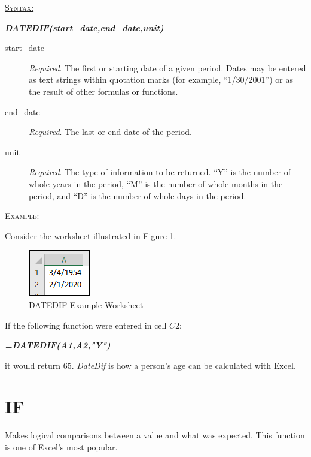\begin{addmargin}[1cm]{0cm}

	\medskip
	\underline{\textsc{Syntax:}}
	\medskip

	{\color{Syntax}
		\noindent\textbf{\textit{DATEDIF(start\_date,end\_date,unit)}}
	}
	
	\begin{description}
		\item[start\_date] \textit{Required}. The first or starting date of a given period. Dates may be entered as text strings within quotation marks (for example, ``1/30/2001'') or as the result of other formulas or functions.
		\item[end\_date] \textit{Required}. The last or end date of the period.
		\item[unit] \textit{Required}. The type of information to be returned. ``Y'' is the number of whole years in the period, ``M'' is the number of whole months in the period, and ``D'' is the number of whole days in the period.
	\end{description}

	\medskip
	\noindent\underline{\textsc{Example:}}
	\medskip
	
	\noindent Consider the worksheet illustrated in Figure \ref{apa:ddf}.
	
	\begin{figure}[H]
		\centering
		\includegraphics[width=\maxwidth{.25\linewidth}]{gfx/apa_fig02}
		\caption{DATEDIF Example Worksheet}
		\label{apa:ddf}
	\end{figure}
	
	\noindent If the following function were entered in cell $ C2 $:
	
	{\color{Syntax}
		\textit{\textbf{=DATEDIF(A1,A2,"Y")}}
	}
	
	\noindent it would return $ 65 $. \textit{DateDif} is how a person's age can be calculated with Excel.

\end{addmargin}

\section{IF}

Makes logical comparisons between a value and what was expected. This function is one of Excel's most popular.

